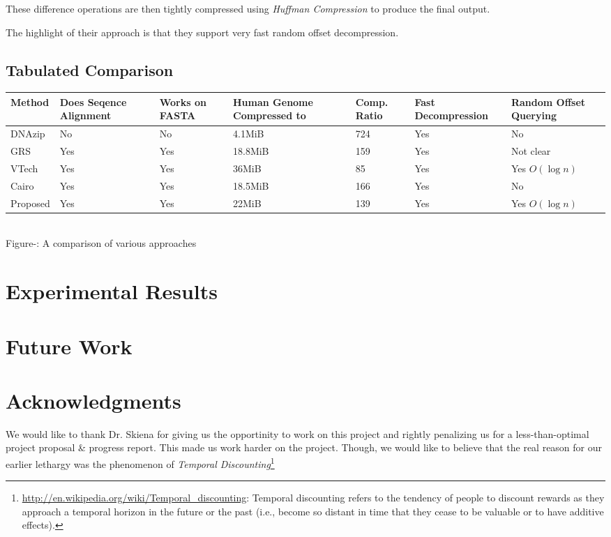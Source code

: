\documentclass[11pt]{article}
\newcounter{fignum}
\begin{document}
These difference operations are then tightly compressed using
\textit{Huffman Compression} to produce the final output.

The highlight of their approach is that they support very fast random
offset decompression.

\subsection{Tabulated Comparison}

\begin{center}
  \begin{tabular}{|p{0.6in}|p{0.7in}|p{0.5in}|p{0.8in}|p{0.5in}|p{0.9in}|p{0.9in}|}
    \hline
    Method & Does Seqence Alignment & Works on FASTA & Human Genome
    Compressed to & Comp. Ratio & Fast Decompression & Random
    Offset Querying\\
    \hline
    DNAzip & No & No & 4.1MiB & 724 & Yes & No\\
    \hline
    GRS & Yes & Yes & 18.8MiB & 159 & Yes & Not clear\\
    \hline
    VTech & Yes & Yes & 36MiB & 85 & Yes & Yes $O(\log{n})$\\
    \hline
    Cairo & Yes & Yes & 18.5MiB & 166 & Yes & No\\
    \hline
    Proposed & Yes & Yes & 22MiB & 139 & Yes & Yes $O(\log{n})$\\
    \hline
  \end{tabular}\\
  \vspace{0.3cm}
  \footnotesize{Figure-: A comparison of various
    approaches}
  \addtocounter{fignum}{1}
\end{center}


\section{Experimental Results}

\section{Future Work}

\section{Acknowledgments}

We would like to thank Dr. Skiena for giving us the opportinity to
work on this project and rightly penalizing us for a less-than-optimal
project proposal \& progress report. This made us work harder on the
project. Though, we would like to believe that the real reason for our
earlier lethargy was the phenomenon of \textit{Temporal
  Discounting}\footnote{\url{http://en.wikipedia.org/wiki/Temporal_discounting}:
  Temporal discounting refers to the tendency of people to discount
  rewards as they approach a temporal horizon in the future or the
  past (i.e., become so distant in time that they cease to be valuable
  or to have additive effects).}
\end{document}
